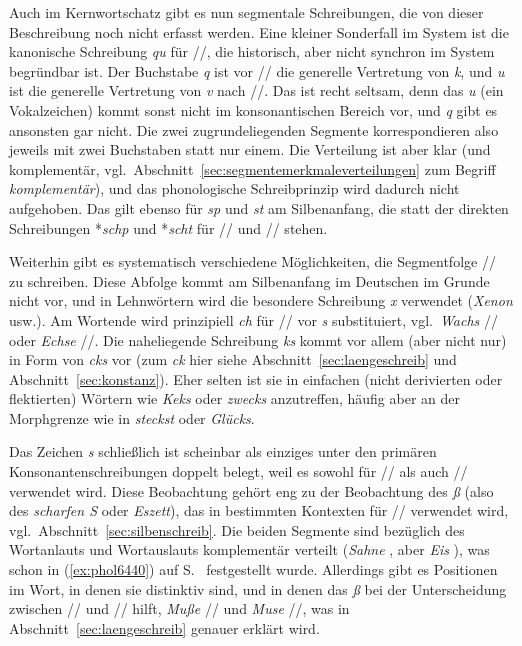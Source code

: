 Auch im Kernwortschatz gibt es nun segmentale Schreibungen, die von dieser Beschreibung noch nicht erfasst werden.
Eine kleiner Sonderfall im System ist die kanonische Schreibung \textit{qu} für //, die historisch, aber nicht synchron im System begründbar ist.
Der Buchstabe \textit{q} ist vor // die generelle Vertretung von \textit{k}, und \textit{u} ist die generelle Vertretung von \textit{v} nach //.
Das ist recht seltsam, denn das \textit{u} (ein Vokalzeichen) kommt sonst nicht im konsonantischen Bereich vor, und \textit{q} gibt es ansonsten gar nicht.
Die zwei zugrundeliegenden Segmente korrespondieren also jeweils mit zwei Buchstaben statt nur einem.
Die Verteilung ist aber klar (und komplementär, vgl.\ Abschnitt~\ref{sec:segmentemerkmaleverteilungen} zum Begriff \textit{komplementär}), und das phonologische Schreibprinzip wird dadurch nicht aufgehoben.
Das gilt ebenso für \textit{sp} und \textit{st} am Silbenanfang, die statt der direkten Schreibungen *\textit{schp} und *\textit{scht} für // und // stehen.

Weiterhin gibt es systematisch verschiedene Möglichkeiten, die Segmentfolge // zu schreiben.
Diese Abfolge kommt am Silbenanfang im Deutschen im Grunde nicht vor, und in Lehnwörtern wird die besondere Schreibung \textit{x} verwendet (\textit{Xenon} usw.).
Am Wortende wird prinzipiell \textit{ch} für // vor \textit{s} substituiert, vgl.\ \textit{Wachs} // oder \textit{Echse} //.
Die naheliegende Schreibung \textit{ks} kommt vor allem (aber nicht nur) in Form von \textit{cks} vor (zum \textit{ck} hier siehe Abschnitt~\ref{sec:laengeschreib} und Abschnitt~\ref{sec:konstanz}).
Eher selten ist sie in einfachen (nicht derivierten oder flektierten) Wörtern wie \textit{Keks} oder \textit{zwecks} anzutreffen, häufig aber an der Morphgrenze wie in \textit{steckst} oder \textit{Glücks}.

Das Zeichen \textit{s} schließlich ist scheinbar als einziges unter den primären Konsonantenschreibungen doppelt belegt, weil es sowohl für // als auch // verwendet wird.
Diese Beobachtung gehört eng zu der Beobachtung des \textit{ß} (also des \textit{scharfen S} oder \textit{Eszett}), das in bestimmten Kontexten für // verwendet wird, vgl.\ Abschnitt~\ref{sec:silbenschreib}.
Die beiden Segmente sind bezüglich des Wortanlauts und Wortauslauts komplementär verteilt (\textit{Sahne} \textipa{[za:n@]}, aber \textit{Eis} \textipa{[P\t{aE}s]}), was schon in (\ref{ex:phol6440}) auf S.~\pageref{ex:phol6440} festgestellt wurde.
Allerdings gibt es Positionen im Wort, in denen sie distinktiv sind, und in denen das \textit{ß} bei der Unterscheidung zwischen // und // hilft, \zB \textit{Muße} // und \textit{Muse} //, was in Abschnitt~\ref{sec:laengeschreib} genauer erklärt wird.

